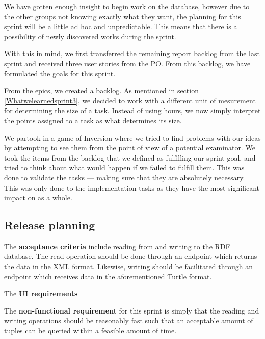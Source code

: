 We have gotten enough insight to begin work on the database, however due to the other groups not knowing exactly what they want, the planning for this sprint will be a little ad hoc and unpredictable.  
This means that there is a possibility of newly discovered works during the sprint.

With this in mind, we first transferred the remaining report backlog from the last sprint and received three user stories from the PO. 
From this backlog, we have formulated the goals for this sprint.

From the epics, we created a backlog. As mentioned in section \ref{Whatwelearnedsprint3}, we decided to work with a different unit of mesurement for determining the size of a task.
Instead of using hours, we now simply interpret the points assigned to a task as what determines its size.

We partook in a game of Inversion  where we tried to find problems with our ideas by attempting to see them from the point of view of a potential examinator. 
We took the items from the backlog that we defined as fulfilling our sprint goal, and tried to think about what would happen if we failed to fulfill them. 
This was done to validate the tasks — making sure that they are absolutely necessary. 
This was only done to the implementation tasks as they have the most significant impact on \knox{} as a whole.

\subsection*{Release planning}
The \textbf{acceptance criteria} include reading from and writing to the RDF database. 
The read operation should be done through an endpoint which returns the data in the XML format.
Likewise, writing should be facilitated through an endpoint which receives data in the aforementioned Turtle format.


The \textbf{UI requirements} 


The \textbf{non-functional requirement} for this sprint is simply that the reading and writing operations should be reasonably fast such that an acceptable amount of tuples can be queried within a feasible amount of time.